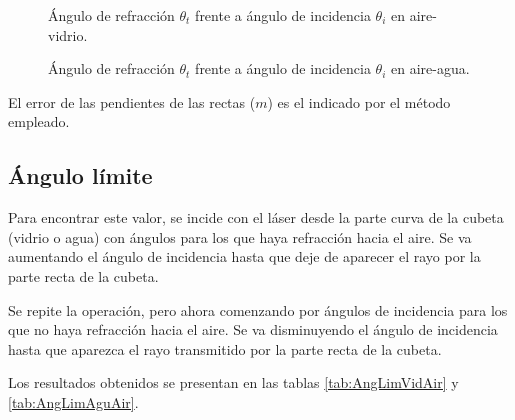 \documentclass[a4paper,twocolumn]{article}
\begin{document}
        	\begin{figure}[ht!]
            	\centering
            	
            	\caption{Ángulo de refracción $\theta_t$ frente a ángulo de incidencia $\theta_i$ en aire-vidrio.}
                \label{fig:AngRefrAirVid}
            \end{figure}

            \begin{figure}[ht!]
            	\centering
            	
            	\caption{Ángulo de refracción $\theta_t$ frente a ángulo de incidencia $\theta_i$ en aire-agua.}
                \label{fig:AngRefrAirAgu}
            \end{figure}            

            El error de las pendientes de las rectas ($m$) es el indicado por el método empleado.

    \subsection{Ángulo límite}
	
	    Para encontrar este valor, se incide con el láser desde la parte curva de la cubeta (vidrio o agua) con ángulos para los que haya refracción hacia el aire. Se va aumentando el ángulo de incidencia hasta que deje de aparecer el rayo por la parte recta de la cubeta.
	    
	    Se repite la operación, pero ahora comenzando por ángulos de incidencia para los que no haya refracción hacia el aire. Se va disminuyendo el ángulo de incidencia hasta que aparezca el rayo transmitido por la parte recta de la cubeta.

            Los resultados obtenidos se presentan en las tablas \ref{tab:AngLimVidAir} y \ref{tab:AngLimAguAir}.
\end{document}
